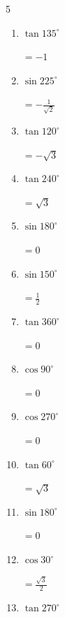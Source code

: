 \begin{multicols}{5}
\begin{enumerate}
        $\displaystyle =-\frac{\sqrt{3}}{2}$

  \item $\displaystyle \tan{135^\circ}$

        $\displaystyle =-1$

  \item $\displaystyle \sin{225^\circ}$

        $\displaystyle =-\frac{1}{\sqrt{2}}$

  \item $\displaystyle \tan{120^\circ}$

        $\displaystyle =-\sqrt{3}$

  \item $\displaystyle \tan{240^\circ}$

        $\displaystyle =\sqrt{3}$

  \item $\displaystyle \sin{180^\circ}$

        $\displaystyle =0$

  \item $\displaystyle \sin{150^\circ}$

        $\displaystyle =\frac{1}{2}$

  \item $\displaystyle \tan{360^\circ}$

        $\displaystyle =0$

  \item $\displaystyle \cos{90^\circ}$

        $\displaystyle =0$

  \item $\displaystyle \cos{270^\circ}$

        $\displaystyle =0$

\columnbreak %

  \item $\displaystyle \tan{60^\circ}$

        $\displaystyle =\sqrt{3}$

  \item $\displaystyle \sin{180^\circ}$

        $\displaystyle =0$

  \item $\displaystyle \cos{30^\circ}$

        $\displaystyle =\frac{\sqrt{3}}{2}$

  \item $\displaystyle \tan{270^\circ}$


\end{enumerate}
\end{multicols}
